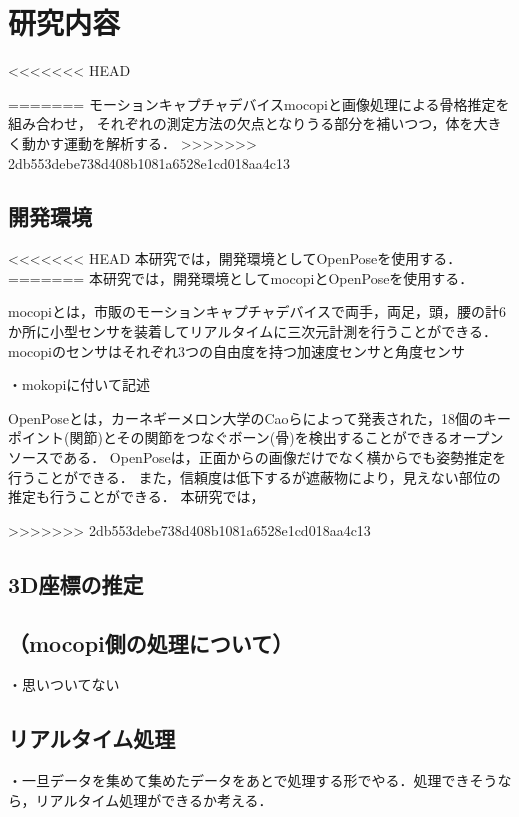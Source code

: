 \documentclass[titlepage]{jarticle}
\begin{document}
\section{研究内容}
%
<<<<<<< HEAD

=======
モーションキャプチャデバイスmocopiと画像処理による骨格推定を組み合わせ，
それぞれの測定方法の欠点となりうる部分を補いつつ，体を大きく動かす運動を解析する．
>>>>>>> 2db553debe738d408b1081a6528e1cd018aa4c13
%
%
\subsection{開発環境}
%
<<<<<<< HEAD
本研究では，開発環境としてOpenPoseを使用する．
=======
本研究では，開発環境としてmocopiとOpenPoseを使用する．

mocopi\cite{mocopi}とは，市販のモーションキャプチャデバイスで両手，両足，頭，腰の計6か所に小型センサを装着してリアルタイムに三次元計測を行うことができる．
mocopiのセンサはそれぞれ3つの自由度を持つ加速度センサと角度センサ

・mokopiに付いて記述


OpenPose\cite{openpose}とは，カーネギーメロン大学のCaoらによって発表された，18個のキーポイント(関節)とその関節をつなぐボーン(骨)を検出することができるオープンソースである．
OpenPoseは，正面からの画像だけでなく横からでも姿勢推定を行うことができる．
また，信頼度は低下するが遮蔽物により，見えない部位の推定も行うことができる．
本研究では，%

>>>>>>> 2db553debe738d408b1081a6528e1cd018aa4c13
%
%
\subsection{3D座標の推定}
%

%
%
\subsection{（mocopi側の処理について）}
%
・思いついてない
%
%
\subsection{リアルタイム処理}
%
・一旦データを集めて集めたデータをあとで処理する形でやる．処理できそうなら，リアルタイム処理ができるか考える．
%
%
%
\end{document}
